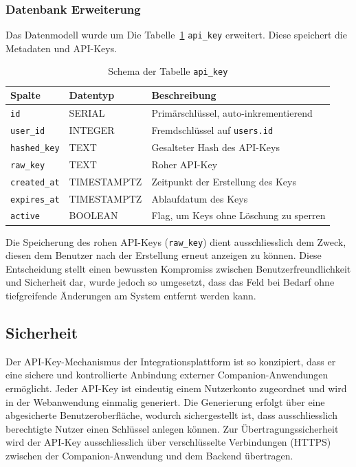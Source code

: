 \documentclass[12pt,a4paper]{report}
\begin{document}
\subsubsection{Datenbank Erweiterung}
Das Datenmodell wurde um Die Tabelle~\ref{tab:api_key_schema} \texttt{api\_key} erweitert. Diese speichert die Metadaten und
API-Keys.

\begin{table}[!htbp]
\centering
\begin{tabular}{|l|l|p{9cm}|}
\hline
  \textbf{Spalte} & \textbf{Datentyp} & \textbf{Beschreibung} \\
\hline
  \texttt{id} & SERIAL & Primärschlüssel, auto-inkrementierend \\
  \texttt{user\_id} & INTEGER & Fremdschlüssel auf \texttt{users.id} \\
  \texttt{hashed\_key} & TEXT & Gesalteter Hash des API-Keys \\
  \texttt{raw\_key} & TEXT & Roher API-Key \\
  \texttt{created\_at} & TIMESTAMPTZ & Zeitpunkt der Erstellung des Keys \\
  \texttt{expires\_at} & TIMESTAMPTZ & Ablaufdatum des Keys \\
  \texttt{active} & BOOLEAN & Flag, um Keys ohne Löschung zu sperren \\
\hline
\end{tabular}
\caption{Schema der Tabelle \texttt{api\_key}}
\label{tab:api_key_schema}
\end{table}

Die Speicherung des rohen API-Keys (\texttt{raw\_key}) dient ausschliesslich dem Zweck, diesen dem Benutzer nach der Erstellung 
erneut anzeigen zu können. Diese Entscheidung stellt einen bewussten Kompromiss zwischen Benutzerfreundlichkeit und Sicherheit
dar, wurde jedoch so umgesetzt, dass das Feld bei Bedarf ohne tiefgreifende Änderungen am System entfernt werden kann.

\subsection{Sicherheit}

Der API-Key-Mechanismus der Integrationsplattform ist so konzipiert, dass er eine sichere und kontrollierte Anbindung externer
Companion-Anwendungen ermöglicht. Jeder API-Key ist eindeutig einem Nutzerkonto zugeordnet und wird in der Webanwendung einmalig
generiert. Die Generierung erfolgt über eine abgesicherte Benutzeroberfläche, wodurch sichergestellt ist, dass ausschliesslich
berechtigte Nutzer einen Schlüssel anlegen können. Zur Übertragungssicherheit wird der API-Key ausschliesslich über verschlüsselte
Verbindungen (HTTPS) zwischen der Companion-Anwendung und dem Backend übertragen.
\end{document}
